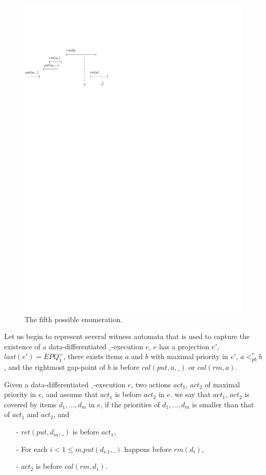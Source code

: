 \begin{figure}[htbp]
  \centering
  \includegraphics[width=0.4 \textwidth]{figures/PIC-HIS-PQ1Equal-5.pdf}
  \caption{The fifth possible enumeration.}
  \label{fig:history enumeration 5 for PQ1Equal}
\end{figure}


Let us begin to represent several witness automata that is used to capture the existence of a data-differentiated $\_$-execution $e$, $e$ has a projection $e'$, $\textit{last}(e') = \textit{EPQ}_1^{=}$, there exists items $a$ and $b$ with maximal priority in $e'$, $a <_{\textit{pb}}^* b$, and the rightmost gap-point of $b$ is before $\textit{cal}(\textit{put},a,\_)$ or $\textit{cal}(\textit{rm},a)$.

Given a data-differentiated $\_$-execution $e$, two actions $\textit{act}_1$, $\textit{act}_2$ of maximal priority in $e$, and assume that $\textit{act}_1$ is before $\textit{act}_2$ in $e$.
we say that $\textit{act}_1$, $\textit{act}_2$ is covered by items $d_1,\ldots,d_m$ in $e$, if the priorities of $d_1,\ldots,d_m$ is smaller than that of $\textit{act}_1$ and $\textit{act}_2$, and

\begin{itemize}
\setlength{\itemsep}{0.5pt}
\item[-] $\textit{ret}(\textit{put},d_m,\_)$ is before $\textit{act}_1$,

\item[-] For each $i < 1 \leq m$,$\textit{put}(d_{\textit{i-1}},\_)$ happens before $\textit{rm}(d_i)$,

\item[-] $\textit{act}_2$ is before $\textit{cal}(\textit{rm},d_1)$.
\end{itemize}

